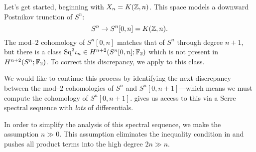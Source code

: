 Let's get started, beginning with $X_n = K(\mathbb Z, n)$.
This space models a downward Postnikov trunction of $S^n$: \[S^n \to S^n[0, n] = K(\mathbb Z, n).\]
The mod--$2$ cohomology of $S^n[0, n]$ matches that of $S^n$ through degree $n+1$, but there is a class $\mathrm{Sq}^2 \iota_n \in H^{n+2}(S^n[0, n]; \mathbb F_2)$ which is not present in $H^{n+2}(S^n; \mathbb F_2)$.
To correct this discrepancy, we apply  to this class.

We would like to continue this process by identifying the next discrepancy between the mod--$2$ cohomologies of $S^n$ and $S^n[0, n+1]$---which means we must compute the cohomology of $S^n[0, n+1]$.
 gives us access to this via a Serre spectral sequence with \emph{lots} of differentials.

\begin{note}
In order to simplify the analysis of this spectral sequence, we make the assumption $n \gg 0$.
This assumption eliminates the inequality condition in  and pushes all product terms into the high degree $2n \gg n$.
\end{note}

